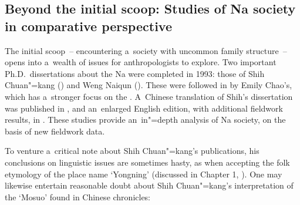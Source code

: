 \subsection[Studies of Na society in comparative perspective]{Beyond the initial scoop: Studies of Na society in comparative perspective}
\label{sec:shih19932010andweng1993}

The initial scoop~-- encountering a~society with uncommon family structure~-- opens into a~wealth of issues for anthropologists to explore. Two important Ph.D.\ dissertations about the Na were completed in 1993: those of Shih Chuan"=kang (\citeyear{shih1993}) and Weng Naiqun (\citeyear{weng1993}). These were followed in \citeyear{chao1995} by Emily Chao’s, which has a~stronger focus on the . A~Chinese translation of Shih’s dissertation was published in \citeyear{shih2008}, and
an~enlarged {English} edition, with additional fieldwork results, in \citeyear{shih2010}. These
studies provide an~in"=depth analysis of Na society, on the basis of new fieldwork data.

To venture a~critical note about Shih Chuan"=kang's publications, his conclusions on linguistic
issues are sometimes hasty, as when accepting the {folk etymology} of the place name ‘Yongning’ (discussed in Chapter 1, ). One may likewise entertain
reasonable doubt about Shih Chuan"=kang’s interpretation of the  ‘Mosuo’ found in
Chinese chronicles: 

